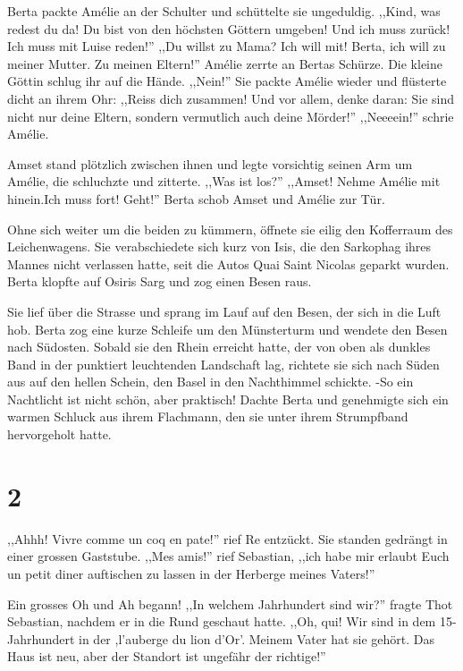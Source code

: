 Berta packte Amélie an der Schulter und schüttelte sie ungeduldig. ,,Kind, was redest du da! Du bist von den höchsten Göttern umgeben! Und ich muss zurück! Ich muss mit Luise reden!'' ,,Du willst zu Mama? Ich will mit! Berta, ich will zu meiner Mutter. Zu meinen Eltern!'' Amélie zerrte an Bertas Schürze. Die kleine Göttin schlug ihr auf die Hände. ,,Nein!'' Sie packte Amélie wieder und flüsterte dicht an ihrem Ohr: ,,Reiss dich zusammen! Und vor allem, denke daran: Sie sind nicht nur deine Eltern, sondern vermutlich auch deine Mörder!'' ,,Neeeein!'' schrie Amélie. 

Amset stand plötzlich zwischen ihnen und legte vorsichtig seinen Arm um Amélie, die schluchzte und zitterte. ,,Was ist los?'' ,,Amset! Nehme Amélie mit hinein.Ich muss fort! Geht!'' Berta schob Amset und Amélie zur Tür. 

Ohne sich weiter um die beiden zu kümmern, öffnete sie eilig den Kofferraum des Leichenwagens. Sie verabschiedete sich kurz von Isis, die den Sarkophag ihres Mannes nicht verlassen hatte, seit die Autos Quai Saint Nicolas geparkt wurden. Berta klopfte auf Osiris Sarg und zog einen Besen raus.

Sie lief über die Strasse und sprang im Lauf auf den Besen, der sich in die Luft hob. Berta zog eine kurze Schleife um den Münsterturm und wendete den Besen nach Südosten. Sobald sie den Rhein erreicht hatte, der von oben als dunkles Band in der punktiert leuchtenden Landschaft lag, richtete sie sich nach Süden aus auf den hellen Schein, den Basel in den Nachthimmel schickte. -So ein Nachtlicht ist nicht schön, aber praktisch! Dachte Berta und genehmigte sich ein warmen Schluck aus ihrem Flachmann, den sie unter ihrem Strumpfband hervorgeholt hatte.


\section*{2}

,,Ahhh! Vivre comme un coq en pate!'' rief Re entzückt. Sie standen gedrängt in einer grossen Gaststube. ,,Mes amis!'' rief Sebastian, ,,ich habe mir erlaubt Euch un petit diner auftischen zu lassen in der Herberge meines Vaters!''

Ein grosses Oh und Ah begann! ,,In welchem Jahrhundert sind wir?'' fragte Thot Sebastian, nachdem er in die Rund geschaut hatte. ,,Oh, qui! Wir sind in dem 15-Jahrhundert in der ,l'auberge du lion d'Or'. Meinem Vater hat sie gehört. Das Haus ist neu, aber der Standort ist ungefähr der richtige!'' 

